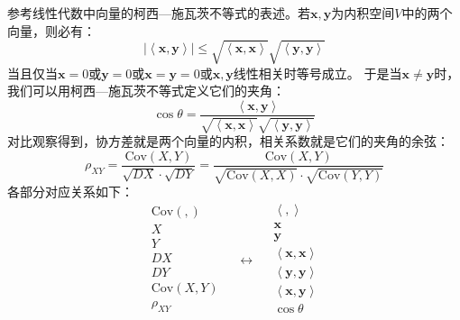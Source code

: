 参考线性代数中向量的柯西—施瓦茨不等式的表述。若$\boldsymbol{x},\boldsymbol{y}$为内积空间$V$中的两个向量，则必有：
\[
\left| \left< \boldsymbol{x},\boldsymbol{y} \right> \right|\leqslant \sqrt{\left< \boldsymbol{x},\boldsymbol{x} \right>}\sqrt{\left< \boldsymbol{y},\boldsymbol{y} \right>}
\]
当且仅当$\boldsymbol{x}=0$或$\boldsymbol{y}=0$或$\boldsymbol{x}=\boldsymbol{y}=0$或$\boldsymbol{x},\boldsymbol{y}$线性相关时等号成立。
于是当$\boldsymbol{x}\ne \boldsymbol{y}$时，我们可以用柯西—施瓦茨不等式定义它们的夹角：
\[
\cos \theta =\frac{\left< \boldsymbol{x},\boldsymbol{y} \right>}{\sqrt{\left< \boldsymbol{x},\boldsymbol{x} \right>}\sqrt{\left< \boldsymbol{y},\boldsymbol{y} \right>}}
\]
对比观察得到，协方差就是两个向量的内积，相关系数就是它们的夹角的余弦：
\[
\rho _{XY}=\frac{\mathrm{Cov}\left( X,Y \right)}{\sqrt{DX}\cdot \sqrt{DY}}=\frac{\mathrm{Cov}\left( X,Y \right)}{\sqrt{\mathrm{Cov}\left( X,X \right)}\cdot \sqrt{\mathrm{Cov}\left( Y,Y \right)}}
\]
各部分对应关系如下：
\[
\begin{array}{l}
	\mathrm{Cov}\left( , \right)\\
	X\\
	Y\\
	DX\\
	DY\\
	\mathrm{Cov}\left( X,Y \right)\\
	\rho _{XY}\\
\end{array} \quad \leftrightarrow \quad \begin{array}{l}
	\left< , \right>\\
	\boldsymbol{x}\\
	\boldsymbol{y}\\
	\left< \boldsymbol{x},\boldsymbol{x} \right>\\
	\left< \boldsymbol{y},\boldsymbol{y} \right>\\
	\left< \boldsymbol{x},\boldsymbol{y} \right>\\
	\cos \theta\\
\end{array}
\]

